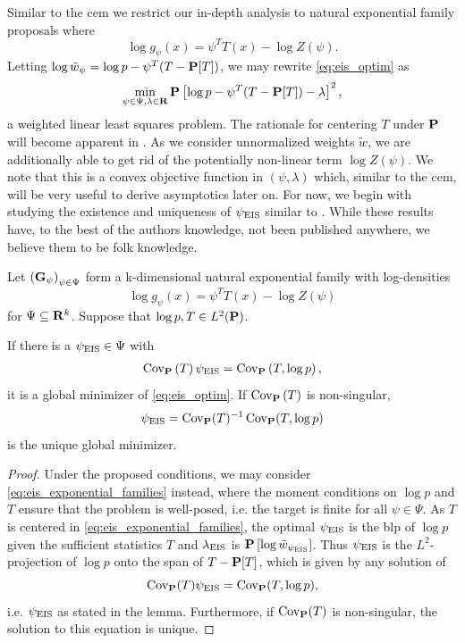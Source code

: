 Similar to the \gls{cem} we restrict our in-depth analysis to natural exponential family proposals where $$\log g_{\psi}(x) = \psi^{T}T(x) - \log Z(\psi).$$ 
Letting $\log \tilde w_{\psi} = \log p - \psi^{T}(T - \P [T])$, we may rewrite \eqref{eq:eis_optim} as
\begin{align}
    \label{eq:eis_exponential_families}
    \min_{\psi \in \Psi, \lambda \in \R} \P \left[ \log p - \psi^{T}(T - \P [T]) - \lambda \right]^{2},
\end{align}
a weighted linear least squares problem. The rationale for centering $T$ under $\P$ will become apparent in .
As we consider unnormalized weights $\tilde w$, we are additionally able to get rid of the potentially non-linear term $\log Z(\psi)$.
We note that this is a convex objective function in $(\psi, \lambda)$ which, similar to the \gls{cem}, will be very useful to derive asymptotics later on. For now, we begin with studying the existence and uniqueness of $\peis$ similar to . While these results have, to the best of the authors knowledge, not been published anywhere, we believe them to be folk knowledge. 

\begin{lemma}
    \label{prop:eis_exponential_families}
    Let $\left( \G_{\psi} \right)_{\psi \in \Psi}$ form a k-dimensional natural exponential family with log-densities 
    $$
        \log g_{\psi}(x) = \psi^{T} T(x) - \log Z(\psi)
    $$
    for $\Psi \subseteq \R^{k}$. Suppose that $\log p, T \in L^{2}(\P)$. 

    If there is a $\peis \in \Psi$ with
    \begin{align}
        \cov_{\P} \left( T \right)\peis = \cov_{\P} \left(T, \log p \right),
    \end{align}
    it is a global minimizer of \eqref{eq:eis_optim}. If $\cov_{\P} \left( T \right)$ is non-singular,
    \begin{align}
        \label{eq:peis-analytical}
        \peis = \cov_{\P} (T) ^{-1} \cov _{\P} (T, \log p )
    \end{align}
    is the unique global minimizer.
\end{lemma}

\begin{proof}
    Under the proposed conditions, we may consider \eqref{eq:eis_exponential_families} instead, where the moment conditions on $\log p $ and $T$ ensure that the problem is well-posed, i.e. the target is finite for all $\psi \in \Psi$. 
    As $T$ is centered in \eqref{eq:eis_exponential_families}, the optimal $\peis$ is the \gls{blp} of $\log p$ given the sufficient statistics $T$ and $\lambda_{\eis}$ is $\P \left[ \log \tilde w_{\peis} \right]$.
    Thus $\peis$ is the $L^{2}$-projection of $\log p$ onto the span of $T - \P[T]$, which is given by any solution of
    $$
        \cov_{\P} (T) \peis = \cov_{\P} (T, \log p),
    $$
    i.e. $\peis$ as stated in the lemma. Furthermore, if $\cov_{\P} (T)$ is non-singular, the solution to this equation is unique.
\end{proof}


